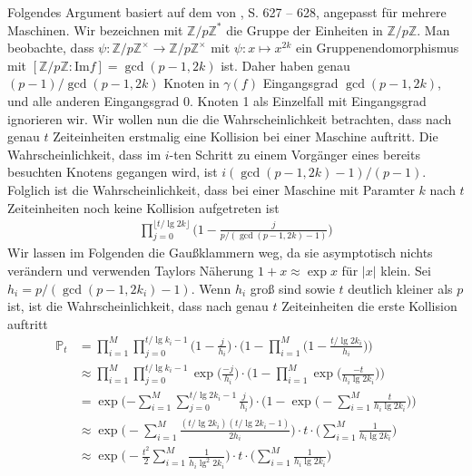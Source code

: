 \documentclass[a4paper, 10pt, ngerman]{article}
\newcommand{\Z}{\mathbb{Z}}
\begin{document}
Folgendes Argument basiert auf dem von \cite{bp81}, S. 627 -- 628, angepasst für mehrere Maschinen. Wir bezeichnen mit $\Z/p\Z^*$ die Gruppe der Einheiten in $\Z/p\Z$. Man beobachte, dass $\psi : \Z/p\Z^\times \to \Z/p\Z^\times$ mit $\psi : x \mapsto x^{2k}$ ein Gruppenendomorphismus mit $[\Z/p\Z : \text{Im} f] = \gcd(p - 1, 2k)$ ist. Daher haben genau $(p - 1) / \gcd(p - 1, 2k)$ Knoten in $\gamma(f)$ Eingangsgrad $\gcd(p - 1, 2k)$, und alle anderen Eingangsgrad 0. Knoten 1 als Einzelfall mit Eingangsgrad ignorieren wir. Wir wollen nun die die Wahrscheinlichkeit betrachten, dass nach genau $t$ Zeiteinheiten erstmalig eine Kollision bei einer Maschine auftritt. Die Wahrscheinlichkeit, dass im $i$-ten Schritt zu einem Vorgänger eines bereits besuchten Knotens gegangen wird, ist $i(\gcd(p - 1, 2k) - 1)/(p - 1)$. Folglich ist die Wahrscheinlichkeit, dass bei einer Maschine mit Paramter $k$ nach $t$ Zeiteinheiten noch keine Kollision aufgetreten ist
\begin{align*}
    \prod_{j = 0}^{\lfloor t / \lg 2k \rfloor} \bigg (1 - \frac {j} {p / (\gcd(p - 1, 2k) - 1)} \bigg )
\end{align*}
Wir lassen im Folgenden die Gaußklammern weg, da sie asymptotisch nichts verändern und verwenden Taylors Näherung $1 + x \approx \exp x$ für $|x|$ klein. Sei $h_i = p / (\gcd(p - 1, 2k_i) - 1)$. Wenn $h_i$ groß sind sowie $t$ deutlich kleiner als $p$ ist, ist die Wahrscheinlichkeit, dass nach genau $t$ Zeiteinheiten die erste Kollision auftritt
\begin{align*}
    \mathbb{P}_t
     & = \prod_{i = 1}^M \prod_{j = 0}^{t / \lg k_i - 1}
    \Bigg (1 - \frac {j} {h_i} \Bigg ) \cdot \Bigg (1 - \prod_{i = 1}^M \Bigg (1 - \frac {t / \lg 2k_i} {h_i} \Bigg ) \Bigg )                                                            \\
     & \approx \prod_{i = 1}^M \prod_{j = 0}^{t / \lg k_i - 1} \exp \Bigg ( \frac {-j}{h_i} \Bigg ) \cdot \Bigg (1 - \prod_{i = 1}^M \exp \Bigg (\frac {-t}{h_i \lg 2k_i} \Bigg )\Bigg ) \\
     & = \exp \Bigg ({- \sum_{i = 1}^M \sum_{j = 0}^{t/\lg 2k_i - 1} \frac j {h_i}} \Bigg ) \cdot \Bigg (1 - \exp \Bigg ( -\sum_{i = 1}^M \frac t {h_i \lg 2k_i} \Bigg ) \Bigg )         \\
     & \approx \exp \Bigg (- \sum_{i = 1}^M \frac {(t/\lg 2k_i)(t/\lg 2k_i - 1)} {2h_i} \Bigg ) \cdot t \cdot \Bigg (\sum_{i = 1}^M \frac 1 {h_i \lg 2k_i} \Bigg )                       \\
     & \approx \exp \Bigg (- \frac {t^2} 2 \sum_{i = 1}^M \frac 1 {h_i \lg^2 2k_i} \Bigg ) \cdot t \cdot \Bigg (\sum_{i = 1}^M \frac 1 {h_i \lg 2k_i} \Bigg )
\end{align*}
\end{document}
